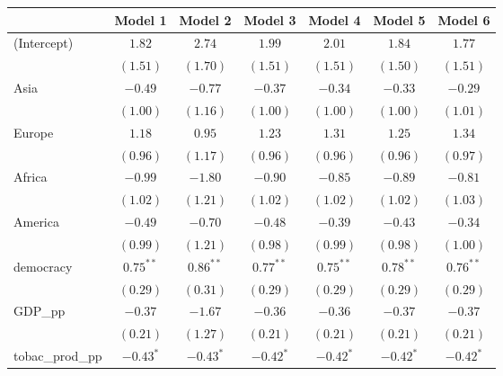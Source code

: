 
\begin{table}[!h]
\begin{center}
\begin{tabular}{l c c c c c c }
\toprule
 & Model 1 & Model 2 & Model 3 & Model 4 & Model 5 & Model 6 \\
\midrule
(Intercept)             & $1.82$       & $2.74$      & $1.99$       & $2.01$       & $1.84$       & $1.77$       \\
                        & $(1.51)$     & $(1.70)$    & $(1.51)$     & $(1.51)$     & $(1.50)$     & $(1.51)$     \\
Asia                    & $-0.49$      & $-0.77$     & $-0.37$      & $-0.34$      & $-0.33$      & $-0.29$      \\
                        & $(1.00)$     & $(1.16)$    & $(1.00)$     & $(1.00)$     & $(1.00)$     & $(1.01)$     \\
Europe                  & $1.18$       & $0.95$      & $1.23$       & $1.31$       & $1.25$       & $1.34$       \\
                        & $(0.96)$     & $(1.17)$    & $(0.96)$     & $(0.96)$     & $(0.96)$     & $(0.97)$     \\
Africa                  & $-0.99$      & $-1.80$     & $-0.90$      & $-0.85$      & $-0.89$      & $-0.81$      \\
                        & $(1.02)$     & $(1.21)$    & $(1.02)$     & $(1.02)$     & $(1.02)$     & $(1.03)$     \\
America                 & $-0.49$      & $-0.70$     & $-0.48$      & $-0.39$      & $-0.43$      & $-0.34$      \\
                        & $(0.99)$     & $(1.21)$    & $(0.98)$     & $(0.99)$     & $(0.98)$     & $(1.00)$     \\
democracy               & $0.75^{**}$  & $0.86^{**}$ & $0.77^{**}$  & $0.75^{**}$  & $0.78^{**}$  & $0.76^{**}$  \\
                        & $(0.29)$     & $(0.31)$    & $(0.29)$     & $(0.29)$     & $(0.29)$     & $(0.29)$     \\
GDP\_pp                 & $-0.37$      & $-1.67$     & $-0.36$      & $-0.36$      & $-0.37$      & $-0.37$      \\
                        & $(0.21)$     & $(1.27)$    & $(0.21)$     & $(0.21)$     & $(0.21)$     & $(0.21)$     \\
tobac\_prod\_pp         & $-0.43^{*}$  & $-0.43^{*}$ & $-0.42^{*}$  & $-0.42^{*}$  & $-0.42^{*}$  & $-0.42^{*}$  \\

\end{tabular}
\end{center}
\end{table}
